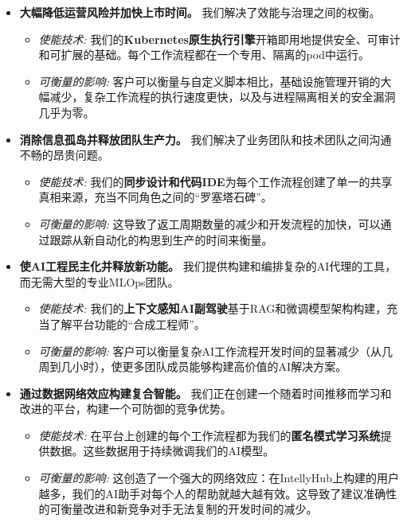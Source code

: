 \documentclass[11pt, a4paper, oneside]{article}
\begin{document}
\begin{itemize}
    \item \textbf{大幅降低运营风险并加快上市时间。} 我们解决了效能与治理之间的权衡。
    \begin{itemize}
        \item \textit{使能技术:} 我们的\textbf{Kubernetes原生执行引擎}开箱即用地提供安全、可审计和可扩展的基础。每个工作流程都在一个专用、隔离的pod中运行。
        \item \textit{可衡量的影响:} 客户可以衡量与自定义脚本相比，基础设施管理开销的大幅减少，复杂工作流程的执行速度更快，以及与进程隔离相关的安全漏洞几乎为零。
    \end{itemize}

    \item \textbf{消除信息孤岛并释放团队生产力。} 我们解决了业务团队和技术团队之间沟通不畅的昂贵问题。
    \begin{itemize}
        \item \textit{使能技术:} 我们的\textbf{同步设计和代码IDE}为每个工作流程创建了单一的共享真相来源，充当不同角色之间的“罗塞塔石碑”。
        \item \textit{可衡量的影响:} 这导致了返工周期数量的减少和开发流程的加快，可以通过跟踪从新自动化的构思到生产的时间来衡量。
    \end{itemize}

    \item \textbf{使AI工程民主化并释放新功能。} 我们提供构建和编排复杂的AI代理的工具，而无需大型的专业MLOps团队。
    \begin{itemize}
        \item \textit{使能技术:} 我们的\textbf{上下文感知AI副驾驶}基于RAG和微调模型架构构建，充当了解平台功能的“合成工程师”。
        \item \textit{可衡量的影响:} 客户可以衡量复杂AI工作流程开发时间的显著减少（从几周到几小时），使更多团队成员能够构建高价值的AI解决方案。
    \end{itemize}
    
    \item \textbf{通过数据网络效应构建复合智能。} 我们正在创建一个随着时间推移而学习和改进的平台，构建一个可防御的竞争优势。
    \begin{itemize}
        \item \textit{使能技术:} 在平台上创建的每个工作流程都为我们的\textbf{匿名模式学习系统}提供数据。这些数据用于持续微调我们的AI模型。
        \item \textit{可衡量的影响:} 这创造了一个强大的网络效应：在IntellyHub上构建的用户越多，我们的AI助手对每个人的帮助就越大越有效。这导致了建议准确性的可衡量改进和新竞争对手无法复制的开发时间的减少。
    \end{itemize}
\end{itemize}
\end{document}
